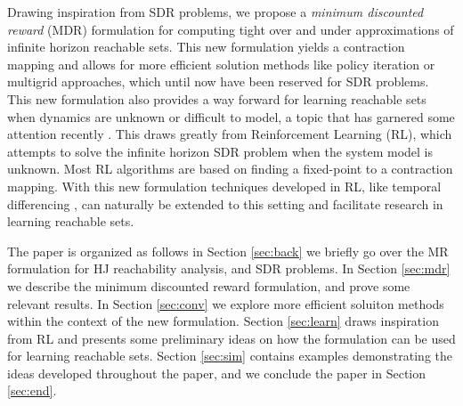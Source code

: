 Drawing inspiration from SDR problems, we propose a \emph{minimum discounted reward} (MDR) formulation for computing tight over and under approximations of infinite horizon reachable sets. This new formulation yields a contraction mapping and allows for more efficient solution methods like policy iteration or multigrid approaches, which until now have been reserved for SDR problems. This new formulation also provides a way forward for learning reachable sets when dynamics are unknown or difficult to model, a topic that has garnered some attention recently \cite{Akametalu2014,Akametalu2015,Allen2014,Djeridane2006,Gillula2012a,Royo2016}. This draws greatly from Reinforcement Learning (RL), which attempts to solve the infinite horizon SDR problem when the system model is unknown. Most RL algorithms are based on finding a fixed-point to a contraction mapping. With this new formulation techniques developed in RL, like temporal differencing \cite{Sutton1988}, can naturally be extended to this setting and facilitate research in learning reachable sets.


The paper is organized as follows in Section \ref{sec:back} we briefly go over the MR formulation for HJ reachability analysis, and SDR problems. In Section \ref{sec:mdr} we describe the minimum discounted  reward formulation, and prove some relevant results. In Section \ref{sec:conv} we explore more efficient soluiton methods within the context of the new formulation. Section \ref{sec:learn} draws inspiration from RL and presents some preliminary ideas on how the formulation can be used for learning reachable sets. Section \ref{sec:sim} contains examples demonstrating the ideas developed throughout the paper, and we conclude the paper in Section \ref{sec:end}.



